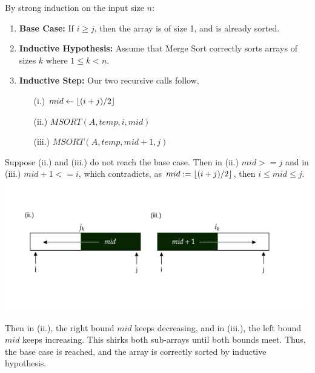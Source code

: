 \vspace{-1.5em}
\begin{Proof}

    By strong induction on the input size $n$:
    
    \begin{enumerate}
        \item \textbf{Base Case:}  
        If $i \geq j$, then the array is of size 1, and is already sorted.
        
        \item \textbf{Inductive Hypothesis:}  
        Assume that Merge Sort correctly sorts arrays of sizes $k$ where $1\leq k < n$.
        
        \item \textbf{Inductive Step:}  
        Our two recursive calls follow, 
        \begin{enumerate}
        \item[(i.)] $mid \gets \lfloor(i + j) / 2\rfloor$
        \item[(ii.)] $MSORT(A, temp, i, mid)$
        \item[(iii.)] $MSORT(A, temp, mid + 1, j)$
        \end{enumerate}
    \end{enumerate}
    \noindent
    Suppose (ii.) and (iii.) do not reach the base case. Then in (ii.) $mid>=j$ and in (iii.) $mid+1<=i$, which contradicts, as
    $mid:=\lfloor(i+j)/2\rfloor$, then $i\leq mid \leq j$.\\

    \vspace{-4em}
    \includegraphics[width=1\textwidth]{sections/recurs/msort_proof.png}

    \vspace{-4em}
    \noindent
    Then in (ii.), the right bound $mid$ keeps decreasing, and in (iii.), the left bound $mid$ keeps increasing.
    This shirks both sub-arrays until both bounds meet. Thus, the base case is reached, and the array is correctly sorted by inductive hypothesis.
\end{Proof}

